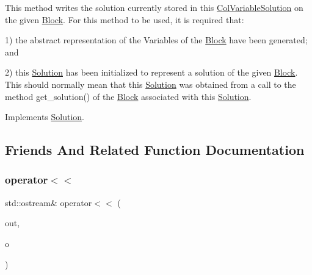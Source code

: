 This method writes the solution currently stored in this \mbox{\hyperlink{class_s_m_spp__di__unipi__it_1_1_col_variable_solution}{Col\+Variable\+Solution}} on the given \mbox{\hyperlink{class_s_m_spp__di__unipi__it_1_1_block}{Block}}. For this method to be used, it is required that\+:

1) the abstract representation of the Variables of the \mbox{\hyperlink{class_s_m_spp__di__unipi__it_1_1_block}{Block}} have been generated; and

2) this \mbox{\hyperlink{class_s_m_spp__di__unipi__it_1_1_solution}{Solution}} has been initialized to represent a solution of the given \mbox{\hyperlink{class_s_m_spp__di__unipi__it_1_1_block}{Block}}. This should normally mean that this \mbox{\hyperlink{class_s_m_spp__di__unipi__it_1_1_solution}{Solution}} was obtained from a call to the method get\+\_\+solution() of the \mbox{\hyperlink{class_s_m_spp__di__unipi__it_1_1_block}{Block}} associated with this \mbox{\hyperlink{class_s_m_spp__di__unipi__it_1_1_solution}{Solution}}. 

Implements \mbox{\hyperlink{class_s_m_spp__di__unipi__it_1_1_solution_a6ba3f1b8f44f35e6a56fc0795587f68a}{Solution}}.



\subsection{Friends And Related Function Documentation}
\mbox{\label{class_s_m_spp__di__unipi__it_1_1_col_variable_solution_a1529e2cc6b571cfe0bd3dd0cfb82b587}} 
\subsubsection{\texorpdfstring{operator$<$$<$}{operator<<}}
{\footnotesize\ttfamily std\+::ostream\& operator$<$$<$ (\begin{DoxyParamCaption}\item[{std\+::ostream \&}]{out,  }\item[{const \mbox{\hyperlink{class_s_m_spp__di__unipi__it_1_1_col_variable_solution}{Col\+Variable\+Solution}} \&}]{o }\end{DoxyParamCaption})\hspace{0.3cm}{\ttfamily [friend]}}



